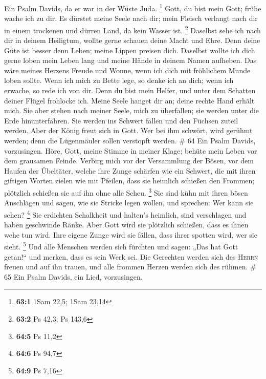  Ein Psalm Davids, da er war in der Wüste Juda.
\footnote{\textbf{63:1} 1Sam 22,5; 1Sam 23,14}  Gott, du
bist mein Gott; frühe wache ich zu dir. Es dürstet meine Seele nach dir;
mein Fleisch verlangt nach dir in einem trockenen und dürren Land, da
kein Wasser ist. \footnote{\textbf{63:2} Ps 42,3; Ps 143,6}
 Daselbst sehe ich nach dir in deinem Heiligtum, wollte
gerne schauen deine Macht und Ehre.  Denn deine Güte ist
besser denn Leben; meine Lippen preisen dich.  Daselbst
wollte ich dich gerne loben mein Leben lang und meine Hände in deinem
Namen aufheben.  Das wäre meines Herzens Freude und Wonne,
wenn ich dich mit fröhlichem Munde loben sollte.  Wenn ich
mich zu Bette lege, so denke ich an dich; wenn ich erwache, so rede ich
von dir.  Denn du bist mein Helfer, und unter dem Schatten
deiner Flügel frohlocke ich.  Meine Seele hanget dir an;
deine rechte Hand erhält mich.  Sie aber stehen nach
meiner Seele, mich zu überfallen; sie werden unter die Erde
hinunterfahren.  Sie werden ins Schwert fallen und den
Füchsen zuteil werden.  Aber der König freut sich in
Gott. Wer bei ihm schwört, wird gerühmt werden; denn die Lügenmäuler
sollen verstopft werden. \# 64  Ein Psalm Davids,
vorzusingen.  Höre, Gott, meine Stimme in meiner Klage;
behüte mein Leben vor dem grausamen Feinde.  Verbirg mich
vor der Versammlung der Bösen, vor dem Haufen der Übeltäter,
 welche ihre Zunge schärfen wie ein Schwert, die mit ihren
giftigen Worten zielen wie mit Pfeilen,  dass sie heimlich
schießen den Frommen; plötzlich schießen sie auf ihn ohne alle Scheu.
\footnote{\textbf{64:5} Ps 11,2}  Sie sind kühn mit ihren
bösen Anschlägen und sagen, wie sie Stricke legen wollen, und sprechen:
Wer kann sie sehen? \footnote{\textbf{64:6} Ps 94,7}  Sie
erdichten Schalkheit und halten's heimlich, sind verschlagen und haben
geschwinde Ränke.  Aber Gott wird sie plötzlich schießen,
dass es ihnen wehe tun wird.  Ihre eigene Zunge wird sie
fällen, dass ihrer spotten wird, wer sie sieht. \footnote{\textbf{64:9}
  Ps 7,16}  Und alle Menschen werden sich fürchten und
sagen: „Das hat Gott getan!{}`` und merken, dass es sein Werk sei.
 Die Gerechten werden sich des \textsc{Herrn} freuen und
auf ihn trauen, und alle frommen Herzen werden sich des rühmen. \# 65
 Ein Psalm Davids, ein Lied, vorzusingen. 
